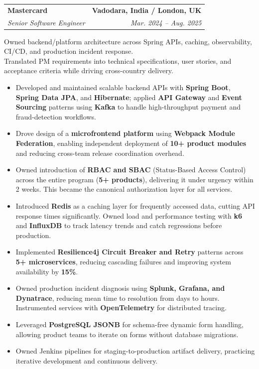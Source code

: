 \documentclass[letterpaper,11pt]{article}
\makeatletter
\newcommand{\resumeItem}[1]{
  \item\small{
    {#1 \vspace{-3pt}}
  }
}
\newcommand{\resumeSubheading}[4]{
  \vspace{-3pt}\item
    \begin{tabular*}{1.0\textwidth}[t]{l@{\extracolsep{\fill}}r}
      \textbf{#1} & \textbf{\small #2} \\
      \textit{\small#3} & \textit{\small #4} \\
    \end{tabular*}\vspace{-2pt}
}
\newcommand{\resumeRoleSummary}[1]{
  {\small #1\par}
  \vspace{-2pt}
}
\newcommand{\resumeItemListStart}{\begin{itemize}}
\newcommand{\resumeItemListEnd}{\end{itemize}\vspace{0pt}}
\makeatother
\begin{document}
    \resumeSubheading
      {Mastercard}{Vadodara, India / London, UK}
      {Senior Software Engineer}{Mar. 2024 -- Aug. 2025}
      \resumeRoleSummary{Owned backend/platform architecture across Spring APIs, caching, observability, CI/CD, and production incident response.\\
      Translated PM requirements into technical specifications, user stories, and acceptance criteria while driving cross-country delivery.}
      \resumeItemListStart
        \resumeItem{Developed and maintained scalable backend APIs with \textbf{Spring Boot}, \textbf{Spring Data JPA}, and \textbf{Hibernate}; applied \textbf{API Gateway} and \textbf{Event Sourcing} patterns using \textbf{Kafka} to handle high-throughput payment and fraud-detection workflows.}
        \resumeItem{Drove design of a \textbf{microfrontend platform} using \textbf{Webpack Module Federation}, enabling independent deployment of \textbf{10+ product modules} and reducing cross-team release coordination overhead.}
        \resumeItem{Owned introduction of \textbf{RBAC and SBAC} (Status-Based Access Control) across the entire program (\textbf{5+ products}), delivering it under urgency within 2 weeks. This became the canonical authorization layer for all services.}
        \resumeItem{Introduced \textbf{Redis} as a caching layer for frequently accessed data, cutting API response times significantly. Owned load and performance testing with \textbf{k6} and \textbf{InfluxDB} to track latency trends and catch regressions before production.}
        \resumeItem{Implemented \textbf{Resilience4j Circuit Breaker and Retry} patterns across \textbf{5+ microservices}, reducing cascading failures and improving system availability by \textbf{15\%}.}
        \resumeItem{Owned production incident diagnosis using \textbf{Splunk, Grafana, and Dynatrace}, reducing mean time to resolution from days to hours. Instrumented services with \textbf{OpenTelemetry} for distributed tracing.}
        \resumeItem{Leveraged \textbf{PostgreSQL JSONB} for schema-free dynamic form handling, allowing product teams to iterate on forms without database migrations.}
        \resumeItem{Owned Jenkins pipelines for staging-to-production artifact delivery, practicing iterative development and continuous delivery.}
      \resumeItemListEnd
\end{document}
